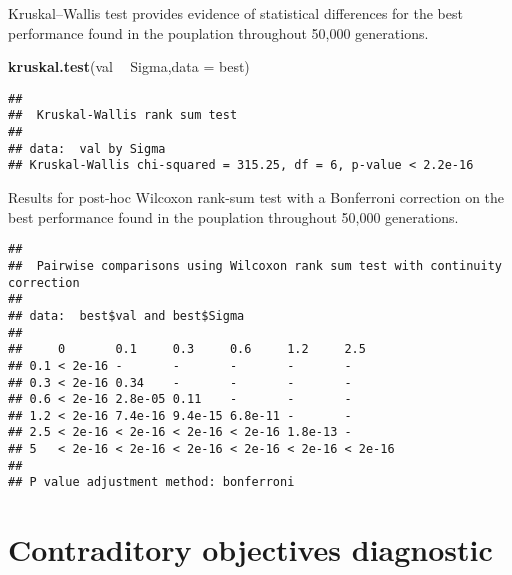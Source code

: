 \documentclass[]{book}
\newenvironment{Shaded}{\begin{snugshade}}{\end{snugshade}}
\newcommand{\DataTypeTok}[1]{\textcolor[rgb]{0.13,0.29,0.53}{#1}}
\newcommand{\KeywordTok}[1]{\textcolor[rgb]{0.13,0.29,0.53}{\textbf{#1}}}
\newcommand{\NormalTok}[1]{#1}
\newcommand{\OperatorTok}[1]{\textcolor[rgb]{0.81,0.36,0.00}{\textbf{#1}}}
\newcommand{\OtherTok}[1]{\textcolor[rgb]{0.56,0.35,0.01}{#1}}
\newcommand{\StringTok}[1]{\textcolor[rgb]{0.31,0.60,0.02}{#1}}
\begin{document}
Kruskal--Wallis test provides evidence of statistical differences for the best performance found in the pouplation throughout 50,000 generations.

\begin{Shaded}
\begin{Highlighting}[]
\KeywordTok{kruskal.test}\NormalTok{(val }\OperatorTok{~}\StringTok{ }\NormalTok{Sigma,}\DataTypeTok{data =}\NormalTok{ best)}
\end{Highlighting}
\end{Shaded}

\begin{verbatim}
## 
##  Kruskal-Wallis rank sum test
## 
## data:  val by Sigma
## Kruskal-Wallis chi-squared = 315.25, df = 6, p-value < 2.2e-16
\end{verbatim}

Results for post-hoc Wilcoxon rank-sum test with a Bonferroni correction on the best performance found in the pouplation throughout 50,000 generations.

\begin{Shaded}
\end{Shaded}

\begin{verbatim}
## 
##  Pairwise comparisons using Wilcoxon rank sum test with continuity correction 
## 
## data:  best$val and best$Sigma 
## 
##     0       0.1     0.3     0.6     1.2     2.5    
## 0.1 < 2e-16 -       -       -       -       -      
## 0.3 < 2e-16 0.34    -       -       -       -      
## 0.6 < 2e-16 2.8e-05 0.11    -       -       -      
## 1.2 < 2e-16 7.4e-16 9.4e-15 6.8e-11 -       -      
## 2.5 < 2e-16 < 2e-16 < 2e-16 < 2e-16 1.8e-13 -      
## 5   < 2e-16 < 2e-16 < 2e-16 < 2e-16 < 2e-16 < 2e-16
## 
## P value adjustment method: bonferroni
\end{verbatim}

\hypertarget{contraditory-objectives-diagnostic-3}{%
\section{Contraditory objectives diagnostic}\label{contraditory-objectives-diagnostic-3}}
\end{document}
